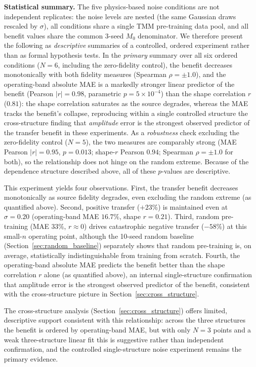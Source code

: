 \documentclass[a4paper,fleqn]{cas-sc}
\newcommand{\Mzero}{M_0}
\begin{document}
\textbf{Statistical summary.} The five physics-based noise conditions are not independent replicates: the noise levels are nested (the same Gaussian draws rescaled by $\sigma$), all conditions share a single TMM pre-training data pool, and all benefit values share the common 3-seed $\Mzero$ denominator. We therefore present the following as \emph{descriptive} summaries of a controlled, ordered experiment rather than as formal hypothesis tests.
In the \emph{primary} summary over all six ordered conditions ($N=6$, including the zero-fidelity control), the benefit decreases monotonically with both fidelity measures (Spearman $\rho = \pm 1.0$), and the operating-band absolute MAE is a markedly stronger linear predictor of the benefit (Pearson $|r| = 0.98$, parametric $p = 5\times10^{-4}$) than the shape correlation $r$ ($0.81$): the shape correlation saturates as the source degrades, whereas the MAE tracks the benefit's collapse, reproducing within a single controlled structure the cross-structure finding that \emph{amplitude} error is the strongest observed predictor of the transfer benefit in these experiments. As a \emph{robustness} check excluding the zero-fidelity control ($N=5$), the two measures are comparably strong (MAE Pearson $|r| = 0.95$, $p = 0.013$; shape-$r$ Pearson $0.94$; Spearman $\rho = \pm 1.0$ for both), so the relationship does not hinge on the random extreme. Because of the dependence structure described above, all of these $p$-values are descriptive.

This experiment yields four observations. First, the transfer benefit decreases monotonically as source fidelity degrades, even excluding the random extreme (as quantified above). Second, positive transfer ($+23\%$) is maintained even at $\sigma = 0.20$ (operating-band MAE $16.7\%$, shape $r = 0.21$). Third, random pre-training (MAE $33\%$, $r \approx 0$) drives catastrophic negative transfer ($-58\%$) at this small-$n$ operating point, although the 10-seed random baseline (Section~\ref{sec:random_baseline}) separately shows that random pre-training is, on average, statistically indistinguishable from training from scratch. Fourth, the operating-band absolute MAE predicts the benefit better than the shape correlation $r$ alone (as quantified above), an internal single-structure confirmation that amplitude error is the strongest observed predictor of the benefit, consistent with the cross-structure picture in Section~\ref{sec:cross_structure}.

The cross-structure analysis (Section~\ref{sec:cross_structure}) offers limited, descriptive support consistent with this relationship: across the three structures the benefit is ordered by operating-band MAE, but with only $N=3$ points and a weak three-structure linear fit this is suggestive rather than independent confirmation, and the controlled single-structure noise experiment remains the primary evidence.
\end{document}
